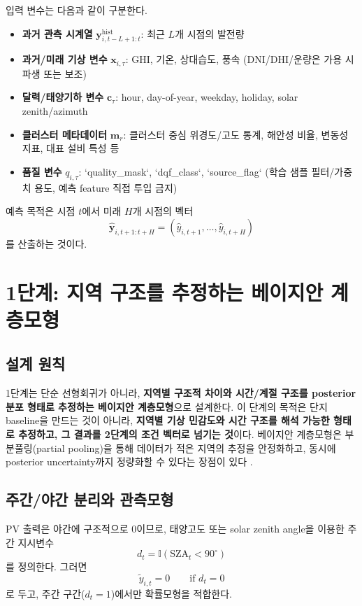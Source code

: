 \documentclass[11pt,a4paper]{article}
\begin{document}
입력 변수는 다음과 같이 구분한다.
\begin{itemize}[leftmargin=2em]
    \item \textbf{과거 관측 시계열} $\bm y^{\mathrm{hist}}_{i,t-L+1:t}$: 최근 $L$개 시점의 발전량
    \item \textbf{과거/미래 기상 변수} $\bm x_{i,\tau}$: GHI, 기온, 상대습도, 풍속 (DNI/DHI/운량은 가용 시 파생 또는 보조)
    \item \textbf{달력/태양기하 변수} $\bm c_{\tau}$: hour, day-of-year, weekday, holiday, solar zenith/azimuth
    \item \textbf{클러스터 메타데이터} $\bm m_r$: 클러스터 중심 위경도/고도 통계, 해안성 비율, 변동성 지표, 대표 설비 특성 등
    \item \textbf{품질 변수} $q_{i,\tau}$: `quality_mask`, `dqf_class`, `source_flag` (학습 샘플 필터/가중치 용도, 예측 feature 직접 투입 금지)
\end{itemize}

예측 목적은 시점 $t$에서 미래 $H$개 시점의 벡터
\begin{equation}
    \hat{\bm y}_{i,t+1:t+H} = (\hat y_{i,t+1},\dots,\hat y_{i,t+H})
\end{equation}
를 산출하는 것이다.

\section{1단계: 지역 구조를 추정하는 베이지안 계층모형}
\subsection{설계 원칙}
1단계는 단순 선형회귀가 아니라, \textbf{지역별 구조적 차이와 시간/계절 구조를 posterior 분포 형태로 추정하는 베이지안 계층모형}으로 설계한다. 이 단계의 목적은 단지 baseline을 만드는 것이 아니라, \textbf{지역별 기상 민감도와 시간 구조를 해석 가능한 형태로 추정하고, 그 결과를 2단계의 조건 벡터로 넘기는 것}이다. 베이지안 계층모형은 부분풀링(partial pooling)을 통해 데이터가 적은 지역의 추정을 안정화하고, 동시에 posterior uncertainty까지 정량화할 수 있다는 장점이 있다 \citep{StanGuide,SaintDrenan2019Bayesian}.

\subsection{주간/야간 분리와 관측모형}
PV 출력은 야간에 구조적으로 0이므로, 태양고도 또는 solar zenith angle을 이용한 주간 지시변수
\begin{equation}
    d_t = \mathbb I(\mathrm{SZA}_t < 90^\circ)
\end{equation}
를 정의한다. 그러면
\begin{equation}
    \tilde y_{i,t}=0 \qquad \text{if } d_t=0
\end{equation}
로 두고, 주간 구간($d_t=1$)에서만 확률모형을 적합한다.
\end{document}
